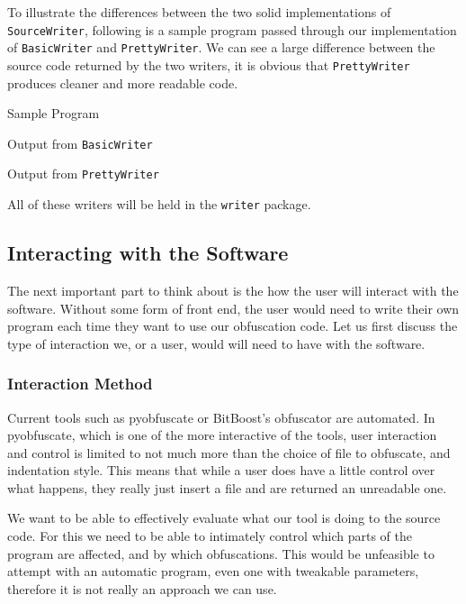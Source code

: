 \documentclass[twoside,a4paper]{report}
\begin{document}
To illustrate the differences between the two solid implementations of \texttt{SourceWriter}, following is a sample program passed through our implementation of
\texttt{BasicWriter} and \texttt{PrettyWriter}. We can see a large difference between the source code returned by the two writers, it is obvious that
\texttt{PrettyWriter} produces cleaner and more readable code.

Sample Program



Output from \texttt{BasicWriter}



Output from \texttt{PrettyWriter}



All of these writers will be held in the \texttt{writer} package.

\subsection{Interacting with the Software}

The next important part to think about is the how the user will interact with the software. Without some form of front end, the
user would need to write their own program each time they want to use our obfuscation code. Let us first discuss the type of
interaction we, or a user, would will need to have with the software.

\subsubsection{Interaction Method}

Current tools such as pyobfuscate or BitBoost's obfuscator are automated. In pyobfuscate, which is one of the more interactive
of the tools, user interaction and control is limited to not much more than the choice of file to obfuscate, and indentation style. This means
that while a user does have a little control over what happens, they really just insert a file and are returned an
unreadable one.

We want to be able to effectively evaluate what our tool is doing to the source code. For this we need to be able to intimately control
which parts of the program are affected, and by which obfuscations. This would be unfeasible to attempt with an automatic program,
even one with tweakable parameters, therefore it is not really an approach we can use.
\end{document}

